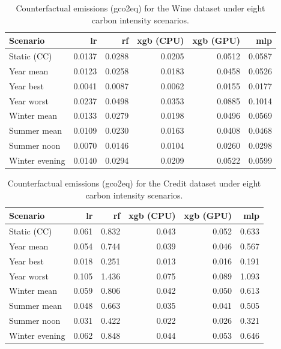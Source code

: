 \begin{table}[htbp]
\centering
\small
\caption[Counterfactual emissions for Wine under timing scenarios.]{Counterfactual emissions (\acrshort{gco2eq}) for the Wine dataset under eight carbon intensity scenarios.}
\label{tab:app_cf_wine}
\begin{tabular}{@{} l r r r r r @{}}
\toprule
\textbf{Scenario} & \textbf{\gls{lr}} & \textbf{\gls{rf}} & \textbf{\gls{xgb} (CPU)} & \textbf{\gls{xgb} (GPU)} & \textbf{\gls{mlp}} \\
\midrule
Static (CC)    & 0.0137 & 0.0288 & 0.0205 & 0.0512 & 0.0587 \\
Year mean      & 0.0123 & 0.0258 & 0.0183 & 0.0458 & 0.0526 \\
Year best      & 0.0041 & 0.0087 & 0.0062 & 0.0155 & 0.0177 \\
Year worst     & 0.0237 & 0.0498 & 0.0353 & 0.0885 & 0.1014 \\
Winter mean    & 0.0133 & 0.0279 & 0.0198 & 0.0496 & 0.0569 \\
Summer mean    & 0.0109 & 0.0230 & 0.0163 & 0.0408 & 0.0468 \\
Summer noon    & 0.0070 & 0.0146 & 0.0104 & 0.0260 & 0.0298 \\
Winter evening & 0.0140 & 0.0294 & 0.0209 & 0.0522 & 0.0599 \\
\bottomrule
\end{tabular}
\end{table}

\begin{table}[htbp]
\small
\centering
\caption[Counterfactual emissions for Credit under timing scenarios.]{Counterfactual emissions (\acrshort{gco2eq}) for the Credit dataset under eight carbon intensity scenarios.}
\label{tab:app_cf_credit}
\begin{tabular}{@{} l r r r r r @{}}
\toprule
\textbf{Scenario} & \textbf{\gls{lr}} & \textbf{\gls{rf}} & \textbf{\gls{xgb} (CPU)} & \textbf{\gls{xgb} (GPU)} & \textbf{\gls{mlp}} \\
\midrule
Static (CC)    & 0.061 & 0.832 & 0.043 & 0.052 & 0.633 \\
Year mean      & 0.054 & 0.744 & 0.039 & 0.046 & 0.567 \\
Year best      & 0.018 & 0.251 & 0.013 & 0.016 & 0.191 \\
Year worst     & 0.105 & 1.436 & 0.075 & 0.089 & 1.093 \\
Winter mean    & 0.059 & 0.806 & 0.042 & 0.050 & 0.613 \\
Summer mean    & 0.048 & 0.663 & 0.035 & 0.041 & 0.505 \\
Summer noon    & 0.031 & 0.422 & 0.022 & 0.026 & 0.321 \\
Winter evening & 0.062 & 0.848 & 0.044 & 0.053 & 0.646 \\
\bottomrule
\end{tabular}
\end{table}

